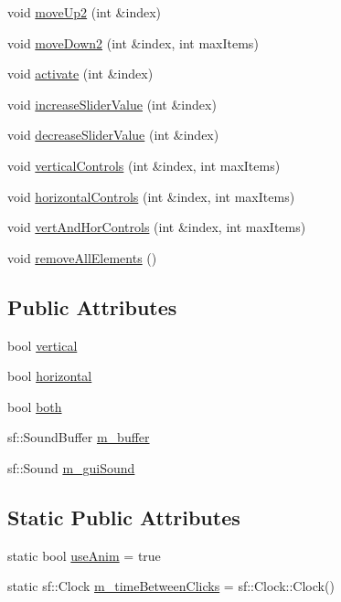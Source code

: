 \begin{DoxyCompactItemize}
\item 
void \mbox{\hyperlink{class_g_u_i_a9b5355f35e5c12d0afea2d3563ab892f}{move\+Up2}} (int \&index)
\item 
void \mbox{\hyperlink{class_g_u_i_a9b7f21e20d6a5ace2f1578c5da278786}{move\+Down2}} (int \&index, int max\+Items)
\item 
void \mbox{\hyperlink{class_g_u_i_a6110a841f353acfc14a23238a7260df6}{activate}} (int \&index)
\item 
void \mbox{\hyperlink{class_g_u_i_ab37a32b8d4f5708d4a5af9a0203c5b40}{increase\+Slider\+Value}} (int \&index)
\item 
void \mbox{\hyperlink{class_g_u_i_a254888c78e0e7fb2d633be5bc5ed2661}{decrease\+Slider\+Value}} (int \&index)
\item 
void \mbox{\hyperlink{class_g_u_i_a980ac546b0bac5afba4c3224af90b97e}{vertical\+Controls}} (int \&index, int max\+Items)
\item 
void \mbox{\hyperlink{class_g_u_i_a1be4ce76c68959d8eb392c1fd23f0a50}{horizontal\+Controls}} (int \&index, int max\+Items)
\item 
void \mbox{\hyperlink{class_g_u_i_a5730f413878465634efb65a1602e4ddf}{vert\+And\+Hor\+Controls}} (int \&index, int max\+Items)
\item 
void \mbox{\hyperlink{class_g_u_i_ae36c26f75d117499a455ea8890236877}{remove\+All\+Elements}} ()
\end{DoxyCompactItemize}
\subsection*{Public Attributes}
\begin{DoxyCompactItemize}
\item 
bool \mbox{\hyperlink{class_g_u_i_a786cc222e797d0f4c241986315b23b90}{vertical}}
\item 
bool \mbox{\hyperlink{class_g_u_i_a107c55f2158d60d53870afd68f51f22a}{horizontal}}
\item 
bool \mbox{\hyperlink{class_g_u_i_aeeaddd3bde704d167a7c217d36b31bc6}{both}}
\item 
sf\+::\+Sound\+Buffer \mbox{\hyperlink{class_g_u_i_ad7a9ebf79685380ef6f0076a04e3f2c1}{m\+\_\+buffer}}
\item 
sf\+::\+Sound \mbox{\hyperlink{class_g_u_i_a0904f940304c0028eb4f3a01458d924d}{m\+\_\+gui\+Sound}}
\end{DoxyCompactItemize}
\subsection*{Static Public Attributes}
\begin{DoxyCompactItemize}
\item 
static bool \mbox{\hyperlink{class_g_u_i_ae22a27f100774c463aea824a436c295c}{use\+Anim}} = true
\item 
static sf\+::\+Clock \mbox{\hyperlink{class_g_u_i_a638d355db4a61b4aee3b63c98e56d213}{m\+\_\+time\+Between\+Clicks}} = sf\+::\+Clock\+::\+Clock()
\end{DoxyCompactItemize}


